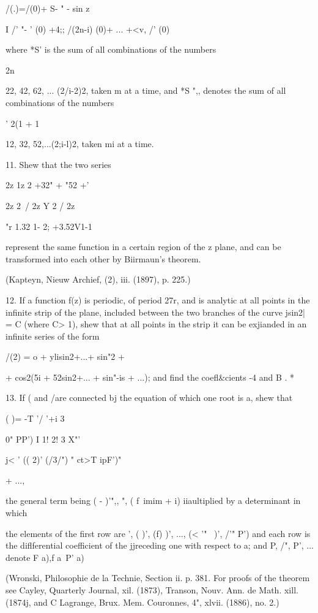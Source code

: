 {/(.)=/(0)+ S- " - sin z

I /' "- ' (0) +4;; /(2n-i) (0)+ ... +<v, /' (0)

where *S' is the sum of all combinations of the numbers

2n

22, 42, 62, ... (2/i-2)2, taken m at a time, and *S ",, denotes the
sum of all combinations of the numbers

' 2(1 + 1

12, 32, 52,...(2;i-l)2, taken mi at a time. 

11. Shew that the two series

2z 1z 2 +32" + "52 +'

2z 2\ / 2z Y 2 / 2z

 "r 1.32 1- 2; +3.52V1-1

represent the same function in a certain region of the z plane, and
can be transformed into each other by Biirmaun's theorem.

(Kapteyn, Nieuw Archief, (2), iii. (1897), p. 225.)

12. If a function f(z) is periodic, of period 27r, and is analytic at
all points in the infinite strip of the plane, included between the
two branches of the curve jsin2| = C (where C> 1), shew that at all
points in the strip it can be exjianded in an infinite series of the
form

/(2) = o + ylisin2+...+ sin"2 +

+ cos2(5i + 52sin2+... + sin"-is + ...); and find the coefl\&cients
-4 and B . *

%
%

13. If ( and /are connected bj the equation of which one root is a,
shew that

 ( )= -T '/ '+i 3

0" PP') I 1! 2! 3 X"'

j< ' (( 2)' (/3/") " ct>T ipF')"

+ ...,

the general term being ( - )'",, ", ( f\ imim + i) iiaultiplied by a
determinant in which

the elements of the first row are ', ( )', (f) )', ..., (< '"~ )', /'"
P') and each row is the diflferential coefficient of the jjreceding
one with respect to a; and P, /", P', ... denote F a),f a\ P' a)

(Wronski, Philosophie de la Technie, Section ii. p. 381. For proofs of
the theorem see Cayley, Quarterly Journal, xil. (1873), Transon, Nouv.
Ann. de Math. xill. (1874j, and C Lagrange, Brux. Mem. Couronnes, 4",
xlvii. (1886), no. 2.)

}
